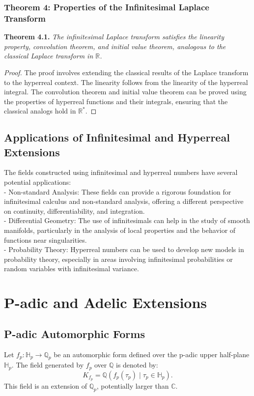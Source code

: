 \documentclass{article}
\begin{document}
\subsubsection{Theorem 4: Properties of the Infinitesimal Laplace Transform}
\textbf{Theorem 4.1.} \textit{The infinitesimal Laplace transform satisfies the linearity property, convolution theorem, and initial value theorem, analogous to the classical Laplace transform in \(\mathbb{R}\).}

\begin{proof}
The proof involves extending the classical results of the Laplace transform to the hyperreal context. The linearity follows from the linearity of the hyperreal integral. The convolution theorem and initial value theorem can be proved using the properties of hyperreal functions and their integrals, ensuring that the classical analogs hold in \(\mathbb{R}^*\).
\end{proof}

\subsection{Applications of Infinitesimal and Hyperreal Extensions}
The fields constructed using infinitesimal and hyperreal numbers have several potential applications:
{\ }\\
- Non-standard Analysis: These fields can provide a rigorous foundation for infinitesimal calculus and non-standard analysis, offering a different perspective on continuity, differentiability, and integration.
{\ }\\
- Differential Geometry: The use of infinitesimals can help in the study of smooth manifolds, particularly in the analysis of local properties and the behavior of functions near singularities.
{\ }\\
- Probability Theory: Hyperreal numbers can be used to develop new models in probability theory, especially in areas involving infinitesimal probabilities or random variables with infinitesimal variance.

\section{P-adic and Adelic Extensions}
\subsection{P-adic Automorphic Forms}
Let \(f_p: \mathbb{H}_p \to \mathbb{Q}_p\) be an automorphic form defined over the p-adic upper half-plane \(\mathbb{H}_p\). The field generated by \(f_p\) over \(\mathbb{Q}\) is denoted by:
\[
K_{f_p} = \mathbb{Q}(f_p(\tau_p) \mid \tau_p \in \mathbb{H}_p).
\]
This field is an extension of \(\mathbb{Q}_p\), potentially larger than \(\mathbb{C}\).
\end{document}
